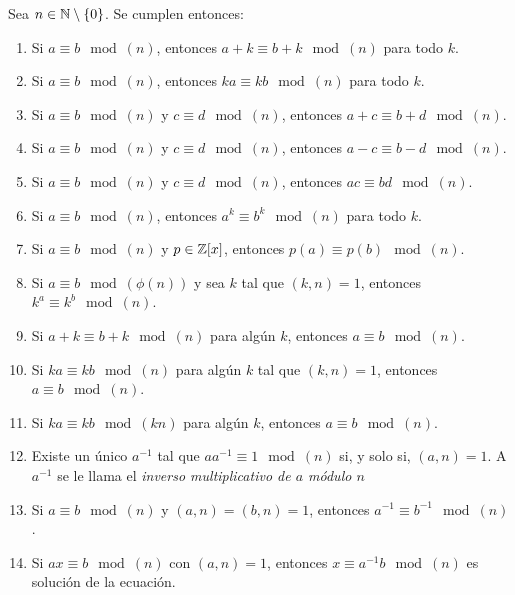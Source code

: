 \begin{proposicion}
	Sea $n \in \mathbb{N} \setminus \{0\}$. Se cumplen entonces:
	
	\begin{enumerate}
		\item Si $a \equiv b \mod(n)$, entonces $a + k \equiv b + k \mod(n)$ para todo $k$.
		
		\item Si $a \equiv b \mod(n)$, entonces $ka \equiv kb \mod(n)$ para todo $k$.
		
		\item Si $a \equiv b \mod(n)$ y $c \equiv d \mod(n)$, entonces $a + c \equiv b + d \mod(n)$.
		
		\item Si $a \equiv b \mod(n)$ y $c \equiv d \mod(n)$, entonces $a - c \equiv b - d \mod(n)$.
		
		\item Si $a \equiv b \mod(n)$ y $c \equiv d \mod(n)$, entonces $ac \equiv bd \mod(n)$.
		
		\item Si $a \equiv b \mod(n)$, entonces $a^k \equiv b^k \mod(n)$ para todo $k$.
		
		\item Si $a \equiv b \mod(n)$ y $p \in \mathbb{Z}[x]$, entonces $p(a) \equiv p(b) \mod(n)$.
		
		\item Si $a \equiv b \mod(\phi(n))$ y sea $k$ tal que $(k, n) = 1$, entonces $k^a \equiv k^b \mod(n)$.
				
		\item Si $a + k \equiv b + k \mod(n)$ para algún $k$, entonces $a \equiv b \mod(n)$.
		
		\item Si $ka \equiv kb \mod(n)$ para algún $k$ tal que $(k, n) = 1$, entonces $a \equiv b \mod(n)$.
		
		\item Si $ka \equiv kb \mod(kn)$ para algún $k$, entonces $a \equiv b \mod(n)$.
		
		\item Existe un único $a^{-1}$ tal que $aa^{-1} \equiv 1 \mod(n)$ si, y solo si, $(a, n) = 1$. A $a^{-1}$ se le llama el \textit{inverso multiplicativo de $a$ módulo $n$}
		
		\item Si $a \equiv b \mod(n)$ y $(a, n) = (b, n) = 1$, entonces $a^{-1} \equiv b^{-1} \mod(n)$.
		
		\item Si $ax \equiv b \mod(n)$ con $(a, n) = 1$, entonces $x \equiv a^{-1}b \mod(n)$ es solución de la ecuación.
	\end{enumerate}
\end{proposicion}

